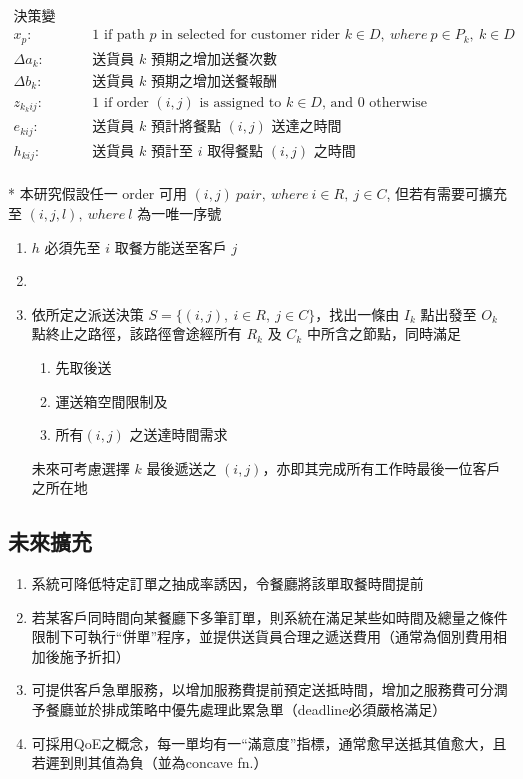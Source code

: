 \documentclass{article}
\begin{document}
\begin{align*}
  \text{決策變數：}\\
  x_p: & 1 \text{ if path $p$ in selected for customer rider } k \in D,\ where\ p \in P_k,\ k \in D \\
  \Delta a_k: & \text{送貨員 $k$ 預期之增加送餐次數} \\
  \Delta b_k: & \text{送貨員 $k$ 預期之增加送餐報酬} \\
  z_{k_kij}: & \text{1 if order $(i, j)$ is assigned to $k \in D$, and 0 otherwise} \\
  e_{kij}: & \text{送貨員 $k$ 預計將餐點 $(i,j)$ 送達之時間 } \\
  h_{kij}: & \text{送貨員 $k$ 預計至 $i$ 取得餐點 $(i,j)$ 之時間 } \\
\end{align*}

* 本研究假設任一 order 可用 $(i,j)\ pair,\ where\ i \in R,\ j \in C$, 但若有需要可擴充至 $(i,j,l),\ where\ l$ 為一唯一序號

\begin{enumerate}
  \def\labelenumi{\arabic{enumi}.}
  \item $h$ 必須先至 $i$ 取餐方能送至客戶 $j$
  \item
  \item 依所定之派送決策 $S = \{(i,j),\ i \in R,\ j \in C\}$，找出一條由 $I_k$ 點出發至 $O_k$ 點終止之路徑，該路徑會途經所有 $R_k$ 及 $C_k$ 中所含之節點，同時滿足
    \begin{enumerate}
      \item 先取後送
      \item 運送箱空間限制及
      \item 所有$(i,j)$ 之送達時間需求
    \end{enumerate}
    未來可考慮選擇 $k$ 最後遞送之 $(i,j)$，亦即其完成所有工作時最後一位客戶之所在地
\end{enumerate}

\subsection*{未來擴充}
\begin{enumerate}
  \def\labelenumi{\arabic{enumi}.}
  \item 系統可降低特定訂單之抽成率誘因，令餐廳將該單取餐時間提前
  \item 若某客戶同時間向某餐廳下多筆訂單，則系統在滿足某些如時間及總量之條件限制下可執行“併單”程序，並提供送貨員合理之遞送費用（通常為個別費用相加後施予折扣）
  \item 可提供客戶急單服務，以增加服務費提前預定送抵時間，增加之服務費可分潤予餐廳並於排成策略中優先處理此累急單（deadline必須嚴格滿足）
  \item 可採用QoE之概念，每一單均有一“滿意度”指標，通常愈早送抵其值愈大，且若遲到則其值為負（並為concave fn.）
\end{enumerate}
\end{document}
